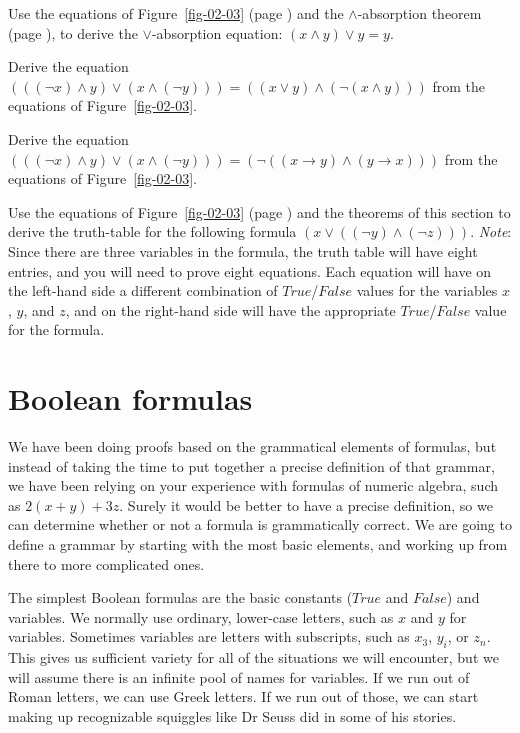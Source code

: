 \begin{ExerciseList}
\Exercise
Use the equations of Figure~\ref{fig-02-03} (page \pageref{fig-02-03})
and the $\wedge$-absorption theorem (page \pageref{and-absorption-thm}),
to derive the $\vee$-absorption equation: $(x \wedge y) \vee y = y$.

\Exercise
Derive the equation
$(((\neg x) \wedge y) \vee (x \wedge (\neg y))) = ((x \vee y) \wedge (\neg(x \wedge y)))$
from the equations of Figure~\ref{fig-02-03}.

\Exercise
Derive the equation
$(((\neg x) \wedge y) \vee (x \wedge (\neg y))) = (\neg((x \rightarrow y) \wedge (y \rightarrow x)))$
from the equations of Figure~\ref{fig-02-03}.

\Exercise
Use the equations of Figure~\ref{fig-02-03} (page \pageref{fig-02-03})
and the theorems of this section to
derive the truth-table for the following formula $(x \vee ((\neg y) \wedge (\neg z)))$.
\emph{Note}: Since there are three variables in the formula, the truth table
will have eight entries, and you will need to prove eight equations.
Each equation will have on the left-hand side
a different combination of $True$/$False$ values for the variables $x$, $y$, and $z$,
and on the right-hand side will have the appropriate $True$/$False$ value for the formula.
\end{ExerciseList}

\section{Boolean formulas}
\label{sec:boolean-formuas}

We have been doing proofs based on the grammatical elements of formulas, but instead of taking the time to put together a precise definition of that grammar, we have been relying on your experience with formulas of numeric algebra, such as $2(x + y) + 3z$. Surely it would be better to have a precise definition, so we can determine whether or not a formula is grammatically correct. We are going to define a grammar by starting with the most basic elements, and working up from there to more complicated ones.

The simplest Boolean formulas are the basic constants ($True$ and $False$) and variables. We normally use ordinary, lower-case letters, such as $x$ and $y$ for variables. Sometimes variables are letters with subscripts, such as $x_3$, $y_i$, or $z_n$. This gives us sufficient variety for all of the situations we will encounter, but we will assume there is an infinite pool of names for variables. If we run out of Roman letters, we can use Greek letters. If we run out of those, we can start making up recognizable squiggles like Dr Seuss did in some of his stories.

